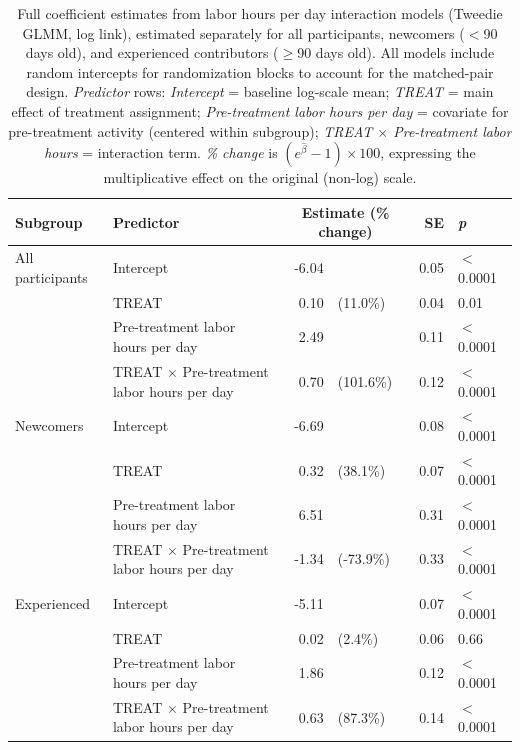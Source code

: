 \documentclass[9pt,twoside,lineno]{pnas-new}
\begin{document}
\clearpage
\begin{table}[ht]
\centering
\small
\caption{Full coefficient estimates from labor hours per day interaction models (Tweedie GLMM, log link), estimated separately for all participants, newcomers ($<$90 days old), and experienced contributors ($\geq$90 days old). All models include random intercepts for randomization blocks to account for the matched-pair design. \textit{Predictor} rows: \textit{Intercept} = baseline log-scale mean; \textit{TREAT} = main effect of treatment assignment; \textit{Pre-treatment labor hours per day} = covariate for pre-treatment activity (centered within subgroup); \textit{TREAT $\times$ Pre-treatment labor hours} = interaction term. \textit{\% change} is $(e^{\hat{\beta}} - 1) \times 100$, expressing the multiplicative effect on the original (non-log) scale.}
\label{table:full_labor_perday}
\begin{tabular}{llr@{\hskip 0.5em}lrl}
\toprule
\textbf{Subgroup} & \textbf{Predictor} & \multicolumn{2}{c}{\textbf{Estimate (\% change)}} & \textbf{SE} & \textbf{\textit{p}} \\
\midrule
All participants & Intercept & -6.04 &  & 0.05 & $<$0.0001 \\
 & TREAT & 0.10 & (11.0\%) & 0.04 & 0.01 \\
 & Pre-treatment labor hours per day & 2.49 &  & 0.11 & $<$0.0001 \\
 & TREAT $\times$ Pre-treatment labor hours per day & 0.70 & (101.6\%) & 0.12 & $<$0.0001 \\
\addlinespace
Newcomers & Intercept & -6.69 & & 0.08 & $<$0.0001 \\
 & TREAT & 0.32 & (38.1\%) & 0.07 & $<$0.0001 \\
 & Pre-treatment labor hours per day & 6.51 &  & 0.31 & $<$0.0001 \\
 & TREAT $\times$ Pre-treatment labor hours per day & -1.34 & (-73.9\%) & 0.33 & $<$0.0001 \\
\addlinespace
Experienced & Intercept & -5.11 &  & 0.07 & $<$0.0001 \\
 & TREAT & 0.02 & (2.4\%) & 0.06 & 0.66 \\
 & Pre-treatment labor hours per day & 1.86 &  & 0.12 & $<$0.0001 \\
 & TREAT $\times$ Pre-treatment labor hours per day & 0.63 & (87.3\%) & 0.14 & $<$0.0001 \\
\bottomrule
\end{tabular}
\end{table}
\end{document}
